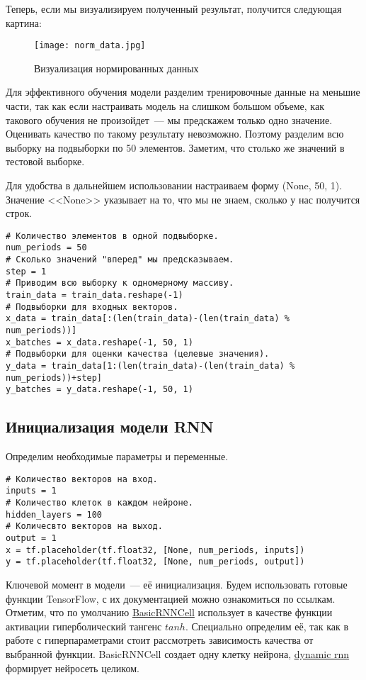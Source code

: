 \documentclass[12pt, a4paper]{article}
\begin{document}
Теперь, если мы визуализируем полученный результат, получится следующая картина:
\begin{figure}[ht]
	\noindent\centering
	\texttt{[image: norm\_data.jpg]}
	\caption{Визуализация нормированных данных}
\end{figure}

Для эффективного обучения модели разделим тренировочные данные на меньшие части, так как если настраивать модель на слишком большом объеме, как такового обучения не произойдет~--- мы предскажем только одно значение. Оценивать качество по такому результату невозможно. Поэтому разделим всю выборку на подвыборки по 50 элементов. Заметим, что столько же значений в  тестовой выборке.

Для удобства в дальнейшем использовании настраиваем форму (None, 50, 1). Значение <<None>>  указывает на то, что мы не знаем, сколько у нас получится строк.
\begin{verbatim}
# Количество элементов в одной подвыборке.
num_periods = 50
# Сколько значений "вперед" мы предсказываем.
step = 1
# Приводим всю выборку к одномерному массиву.
train_data = train_data.reshape(-1)
# Подвыборки для входных векторов.
x_data = train_data[:(len(train_data)-(len(train_data) % num_periods))]
x_batches = x_data.reshape(-1, 50, 1)
# Подвыборки для оценки качества (целевые значения).
y_data = train_data[1:(len(train_data)-(len(train_data) % num_periods))+step]
y_batches = y_data.reshape(-1, 50, 1)
\end{verbatim}
\subsection{Инициализация модели RNN}
Определим необходимые параметры и переменные.
\begin{verbatim}
# Количество векторов на вход.
inputs = 1
# Количество клеток в каждом нейроне.
hidden_layers = 100
# Количесвто векторов на выход.
output = 1
x = tf.placeholder(tf.float32, [None, num_periods, inputs])
y = tf.placeholder(tf.float32, [None, num_periods, output])
\end{verbatim}

Ключевой момент в модели~--- её инициализация. Будем использовать готовые функции TensorFlow, с их документацией можно ознакомиться по ссылкам. Отметим, что по умолчанию \href{https://www.tensorflow.org/api_docs/python/tf/contrib/rnn/BasicRNNCell}{BasicRNNCell} использует в качестве функции активации гиперболический тангенс $tanh$. Специально определим её, так как в работе с гиперпараметрами стоит рассмотреть зависимость качества от выбранной функции. BasicRNNCell создает одну клетку нейрона, \href{https://www.tensorflow.org/api_docs/python/tf/nn/dynamic_rnn}{dynamic rnn} формирует нейросеть целиком.
\end{document}
